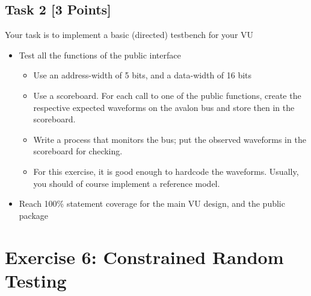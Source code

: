 \documentclass[12pt,epsf,makeidx,oneside]{book}
\begin{document}
  \subsection{Task 2 [3 Points]}
  Your task is to implement a basic (directed) testbench for your VU
  \begin{itemize}[noitemsep]
    \item Test all the functions of the public interface
    \begin{itemize}[noitemsep]
      \item Use an address-width of 5 bits, and a data-width of 16 bits
      \item Use a scoreboard. For each call to one of the public functions, create the respective expected waveforms on the avalon bus and store then in the scoreboard.
      \item Write a process that monitors the bus; put the observed waveforms in the scoreboard for checking.
      \item For this exercise, it is good enough to hardcode the waveforms. Usually, you should of course implement a reference model.
    \end{itemize}
    \item Reach 100\% statement coverage for the main VU design, and the public package
  \end{itemize}


\section{Exercise 6: Constrained Random Testing}
\end{document}
